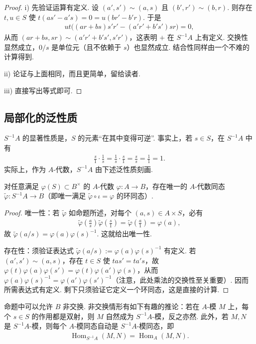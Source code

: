 \begin{proof}
i) 先验证运算有定义. 设 $(a',s')\sim(a,s)$ 且 $(b',r')\sim(b,r)$. 则存在 $t,u\in S$ 使 $t(as'-a's)=0=u(br'-b'r)$. 于是
\begin{align*}
ut\bigl((ar+bs)s'r'-(a'r'+b's')sr\bigr)=0,
\end{align*}
从而 $(ar+bs,sr)\sim(a'r'+b's',s'r')$，这表明 $+$ 在 $S^{-1}A$ 上有定义. 交换性显然成立，$0/s$ 是单位元（且不依赖于 $s$）也显然成立. 结合性同样由一个不难的计算得到.

ii) 论证与上面相同，而且更简单，留给读者.

iii) 直接写出等式即可.
\end{proof}
\subsection{局部化的泛性质}\label{sec:galois-1-6-2}
$S^{-1}A$ 的显著性质是，$S$ 的元素``在其中变得可逆''. 事实上，若 $s\in S$，在 $S^{-1}A$ 中有
\begin{align*}
\frac s1\cdot\frac1s=\frac1s\cdot\frac s1=\frac ss=\frac11=1.
\end{align*}
实际上，作为 $A$-代数，$S^{-1}A$ 由下述泛性质刻画.
\begin{proposition*}
对任意满足 $\varphi(S)\subset B^\times$ 的 $A$-代数 $\varphi:A\longrightarrow B$，存在唯一的 $A$-代数同态 $\widetilde\varphi:S^{-1}A\longrightarrow B$（即唯一满足 $\widetilde\varphi\circ\iota=\varphi$ 的环同态）.
\end{proposition*}
\begin{proof}
唯一性：若 $\widetilde\varphi$ 如命题所述，对每个 $(a,s)\in A\times S$，必有
\begin{align*}
\widetilde\varphi\left(\frac as\right)\widetilde\varphi\left(\frac s1\right)
=\widetilde\varphi\left(\frac a1\right)=\varphi(a),
\end{align*}
故 $\widetilde\varphi(a/s)=\varphi(a)\varphi(s)^{-1}$. 这就给出唯一性.

存在性：须验证表达式 $\widetilde\varphi(a/s):=\varphi(a)\varphi(s)^{-1}$ 有定义. 若 $(a',s')\sim(a,s)$，存在 $t\in S$ 使 $tas'=ta's$，故 $\varphi(t)\varphi(a)\varphi(s')=\varphi(t)\varphi(a')\varphi(s)$，从而 $\varphi(a)\varphi(s)^{-1}=\varphi(a')\varphi(s')^{-1}$（注意，此处乘法的交换性至关重要）. 因而所需表达式有定义. 剩下只须验证它定义一个环同态，这是直接的计算.
\end{proof}
\begin{remark*}
命题中可以允许 $B$ 非交换. 非交换情形有如下有趣的推论：若在 $A$-模 $M$ 上，每个 $s\in S$ 的作用都是双射，则 $M$ 自然成为 $S^{-1}A$-模，反之亦然. 此外，若 $M,N$ 是 $S^{-1}A$-模，则每个 $A$-模同态自动是 $S^{-1}A$-模同态，即
\begin{align*}
\operatorname{Hom}_{S^{-1}A}(M,N)=\operatorname{Hom}_A(M,N).
\end{align*}
\end{remark*}

